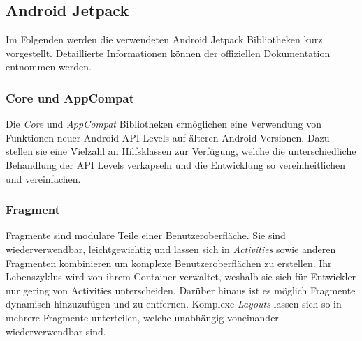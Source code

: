 \documentclass[a4paper, 11pt]{article}
\begin{document}

\subsection{Android Jetpack}
\label{subsec:app:jetpack}
Im Folgenden werden die verwendeten Android Jetpack Bibliotheken kurz vorgestellt. Detaillierte Informationen können der offiziellen Dokumentation entnommen werden.

\subsubsection{Core und AppCompat}
\label{subsubsec:app:jetpack:base}
Die \textit{Core} und \textit{AppCompat} Bibliotheken ermöglichen eine Verwendung von Funktionen neuer Android API Levels auf älteren Android Versionen.
Dazu stellen sie eine Vielzahl an Hilfsklassen zur Verfügung, welche die unterschiedliche Behandlung der API Levels verkapseln und die Entwicklung so vereinheitlichen und vereinfachen.

\subsubsection{Fragment}
\label{subsubsec:app:jetpack:fragment}
Fragmente sind modulare Teile einer Benutzeroberfläche.
Sie sind wiederverwendbar, leichtgewichtig und lassen sich in \textit{Activities} sowie anderen Fragmenten kombinieren um komplexe Benutzeroberflächen zu erstellen.
Ihr Lebenszyklus wird von ihrem Container verwaltet, weshalb sie sich für Entwickler nur gering von Activities unterscheiden.
Darüber hinaus ist es möglich Fragmente dynamisch hinzuzufügen und zu entfernen.
Komplexe \textit{Layouts} lassen sich so in mehrere Fragmente unterteilen, welche unabhängig voneinander wiederverwendbar sind.
\end{document}
